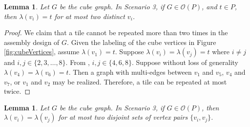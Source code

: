 \documentclass{elsarticle}
\newtheorem{lemma}[theorem]{Lemma}
\theoremstyle{definition}
\theoremstyle{remark}
\theoremstyle{plain}
\theoremstyle{plain}
\begin{document}
    \begin{lemma}\label{lemma1_Cube3}
Let $G$ be the cube graph. In Scenario 3, if $G \in \mathcal{O}(P)$, and $t \in P$, then $\lambda(v_i)=t$ for at most two distinct $v_i$.
\end{lemma}

\begin{proof}
We  claim that a tile cannot be repeated more than two times in the assembly design of $G$. Given the labeling of the cube vertices in Figure \ref{fig:cubeVertices}, assume $\lambda(v_1) = t$. Suppose $\lambda(v_i)= \lambda(v_j)=t$ where $i \neq j$ and $i,j \in \{2, 3, \ldots, 8\}$. From \cite{ellis2014minimal}, $i, j \in \{4, 6, 8\}$. Suppose without loss of generality $\lambda(v_4) = \lambda(v_6)= t$. Then a graph with multi-edges between $v_1$ and $v_5$, $v_4$ and $v_7$, or $v_1$ and $v_2$ may be realized.  Therefore, a tile can be repeated at most twice. 
\end{proof}


\begin{lemma}\label{lemma3_CubeNoRepeat3tiles}
Let $G$ be the cube graph. In Scenario 3, if $G \in \mathcal{O}(P)$, then $\lambda(v_i)=\lambda(v_j)$ for at most two disjoint sets of vertex pairs $\{v_i,v_j\}$.
\end{lemma}
\end{document}
